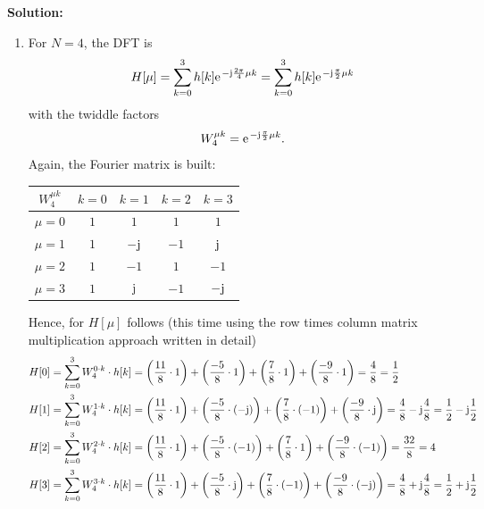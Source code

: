 \documentclass[11pt,a4paper,DIV=12]{scrartcl}
\begin{document}
\begin{Loesung}
\textbf{Solution:}
\begin{enumerate}[label=\alph*)]
	\item For $N=4$, the DFT is
	\begin{equation}
	H[\mu]=\sum_{k=0}^{3}h[k]\e^{-\im\frac{2\pi}{4}\mu k}=\sum_{k=0}^{3}h[k]\e^{-\im\frac{\pi}{2}\mu k}\nonumber
	\end{equation}
	with the twiddle factors
	\begin{equation}
	W_4^{\mu k}=\e^{-\im\frac{\pi}{2}\mu k}\nonumber.
	\end{equation}
	Again, the Fourier matrix is built:
	\begin{center}
		\begin{tabular}{|c|c|c|c|c|}
		\hline
		$W_4^{\mu k}$ & $k=0$ & $k=1$ & $k=2$ & $k=3$\\\hline
		$\mu=0$ & $1$ & $1$ & $1$ & $1$\\\hline
		$\mu=1$ & $1$ & $-\im$ & $-1$ & $\im$\\\hline
		$\mu=2$ & $1$ & $-1$ & $1$ & $-1$\\\hline
		$\mu=3$ & $1$ & $\im$ & $-1$ & $-\im$\\\hline
		\end{tabular}
	\end{center}
	Hence, for $H[\mu]$ follows (this time using the row times column matrix
	multiplication approach written in detail)
	\begin{align}
	H[0]&=\sum_{k=0}^{3} W_4^{0\cdot k} \cdot h[k]=\left(\frac{11}{8}\cdot1\right)+\left(\frac{-5}{8}\cdot1\right)+\left(\frac{7}{8}\cdot1\right)+\left(\frac{-9}{8}\cdot1\right)=\frac{4}{8}=\frac{1}{2}\nonumber\\
	H[1]&=\sum_{k=0}^{3} W_4^{1\cdot k} \cdot h[k]=\left(\frac{11}{8}\cdot1\right)+\left(\frac{-5}{8}\cdot(-\im)\right)+\left(\frac{7}{8}\cdot(-1)\right)+\left(\frac{-9}{8}\cdot\im\right)=\frac{4}{8}-\im\frac{4}{8}=\frac{1}{2}-\im\frac{1}{2}\nonumber\\
	H[2]&=\sum_{k=0}^{3} W_4^{2\cdot k} \cdot h[k]=\left(\frac{11}{8}\cdot1\right)+\left(\frac{-5}{8}\cdot(-1)\right)+\left(\frac{7}{8}\cdot1\right)+\left(\frac{-9}{8}\cdot(-1)\right)=\frac{32}{8}=4\nonumber\\
	H[3]&=\sum_{k=0}^{3} W_4^{3\cdot k} \cdot h[k]=\left(\frac{11}{8}\cdot1\right)+\left(\frac{-5}{8}\cdot\im\right)+\left(\frac{7}{8}\cdot(-1)\right)+\left(\frac{-9}{8}\cdot(-\im)\right)=\frac{4}{8}+\im\frac{4}{8}=\frac{1}{2}+\im\frac{1}{2}\nonumber
	\end{align}

\end{enumerate}
\end{Loesung}
\end{document}
